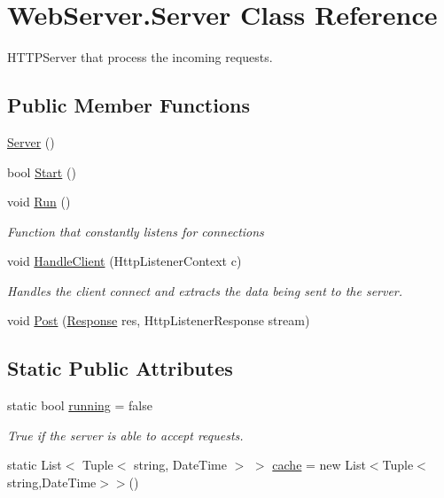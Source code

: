 \hypertarget{class_web_server_1_1_server}{}\section{Web\+Server.\+Server Class Reference}
\label{class_web_server_1_1_server}


H\+T\+T\+P\+Server that process the incoming requests.  


\subsection*{Public Member Functions}
\begin{DoxyCompactItemize}
\item 
\hyperlink{class_web_server_1_1_server_ad330bfa277d422d82793bc5f6de83ad4}{Server} ()
\item 
bool \hyperlink{class_web_server_1_1_server_af6882e9fbb66cb27880198a0c0bb301b}{Start} ()
\item 
void \hyperlink{class_web_server_1_1_server_a83ce026fab9839ed0ca193977c50bb7b}{Run} ()
\begin{DoxyCompactList}\small\item\em Function that constantly listens for connections \end{DoxyCompactList}\item 
void \hyperlink{class_web_server_1_1_server_afe0e981788cf1391f02bbbc416b8bd0c}{Handle\+Client} (Http\+Listener\+Context c)
\begin{DoxyCompactList}\small\item\em Handles the client connect and extracts the data being sent to the server. \end{DoxyCompactList}\item 
void \hyperlink{class_web_server_1_1_server_ab337c60d132ca49465d17cac9328b23b}{Post} (\hyperlink{class_web_server_1_1_response}{Response} res, Http\+Listener\+Response stream)
\end{DoxyCompactItemize}
\subsection*{Static Public Attributes}
\begin{DoxyCompactItemize}
\item 
static bool \hyperlink{class_web_server_1_1_server_aea270e1d81ce0cd9fab583d7c5b3d607}{running} = false
\begin{DoxyCompactList}\small\item\em True if the server is able to accept requests. \end{DoxyCompactList}\item 
static List$<$ Tuple$<$ string, Date\+Time $>$ $>$ \hyperlink{class_web_server_1_1_server_afe0b135529c6978a1807634318656d2a}{cache} = new List$<$Tuple$<$string,Date\+Time$>$$>$()
\end{DoxyCompactItemize}


